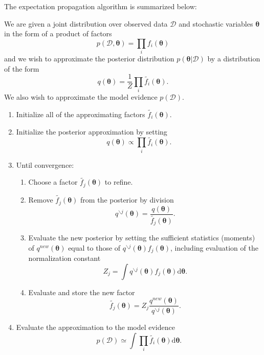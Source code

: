 \documentclass[a4paper]{book}
\newcommand{\ud}{\mathrm{d}}
\renewcommand{\cal}{\mathcal}
\newcommand{\bs}{\boldsymbol}
\begin{document}
The expectation propagation algorithm is summarized below:

We are given a joint distribution over observed data $\cal{D}$ and stochastic variables $\bs{\theta}$ in the form of a product of factors
\begin{equation}
	p(\cal{D},\bs{\theta}) = \prod_i f_i(\bs{\theta})
\end{equation}
and we wish to approximate the posterior distribution $p(\bs{\theta}|\cal{D})$ by a distribution of the form
\begin{equation}
	q(\bs{\theta}) = \frac{1}{Z} \prod_i \tilde{f_i}(\bs{\theta}).
\end{equation}
We also wish to approximate the model evidence $p(\cal{D})$.
\begin{enumerate}
	\item Initialize all of the approximating factors $\tilde{f_i}(\bs{\theta})$.
	\item Initialize the posterior approximation by setting
	\begin{equation}
		q(\bs{\theta}) \propto \prod_i \tilde{f_i}(\bs{\theta}).
	\end{equation}
	\item Until convergence:
		\begin{enumerate}
		\item Choose a factor $\tilde{f_j}(\bs{\theta})$ to refine.
		\item Remove $\tilde{f_j}(\bs{\theta})$ from the posterior by division
		\begin{equation}
			q^{\backslash j}(\bs{\theta}) = \frac{q(\bs{\theta})}{\tilde{f_j}(\bs{\theta})}.
		\end{equation}
		\item Evaluate the new posterior by setting the sufficient statistics (moments) of $q^{new}(\bs{\theta})$ equal to those of $q^{\backslash j}(\bs{\theta})f_j(\bs{\theta})$, including evaluation of the normalization constant
		\begin{equation}
			Z_j = \int q^{\backslash j}(\bs{\theta})f_j(\bs{\theta}) \ud \bs{\theta}.
		\end{equation}
		\item Evaluate and store the new factor
		\begin{equation}
			\tilde{f_j}(\bs{\theta}) = Z_j \frac{q^{new}(\bs{\theta})}{q^{\backslash j}(\bs{\theta})}.
		\end{equation}
		\end{enumerate}
		\item Evaluate the approximation to the model evidence
		\begin{equation}
			p(\cal{D}) \simeq \int \prod_i \tilde{f_i}(\bs{\theta})\ud \bs{\theta}.
		\end{equation}
\end{enumerate}
\end{document}

